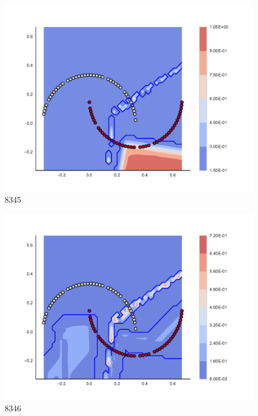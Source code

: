 \begin{subfigure}[b]{0.09\textwidth}
    \includegraphics[clip, trim=2.35cm 1.75cm 4.5cm 0cm,width=\textwidth]{img/convergence/8345.pdf}
    \caption{8345}
    \label{fig:convergence_8345}
\end{subfigure}
%
\begin{subfigure}[b]{0.09\textwidth}
    \includegraphics[clip, trim=2.35cm 1.75cm 4.5cm 0cm,width=\textwidth]{img/convergence/8346.pdf}
    \caption{8346}
    \label{fig:convergence_8346}
\end{subfigure}
%
